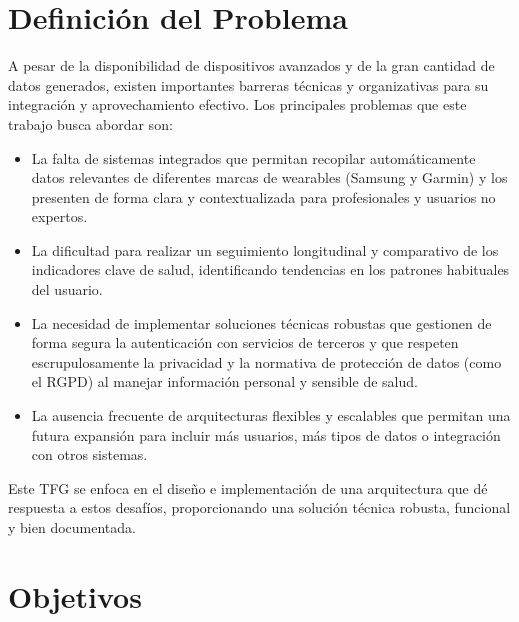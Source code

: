 \section{Definición del Problema}

A pesar de la disponibilidad de dispositivos avanzados y de la gran cantidad de datos generados, existen importantes barreras técnicas y organizativas para su integración y aprovechamiento efectivo. Los principales problemas que este trabajo busca abordar son:

\begin{itemize}
    \item La falta de sistemas integrados que permitan recopilar automáticamente datos relevantes de diferentes marcas de wearables (Samsung y Garmin) y los presenten de forma clara y contextualizada para profesionales y usuarios no expertos.
    \item La dificultad para realizar un seguimiento longitudinal y comparativo de los indicadores clave de salud, identificando tendencias en los patrones habituales del usuario.
    \item La necesidad de implementar soluciones técnicas robustas que gestionen de forma segura la autenticación con servicios de terceros y que respeten escrupulosamente la privacidad y la normativa de protección de datos (como el RGPD) al manejar información personal y sensible de salud.
    \item La ausencia frecuente de arquitecturas flexibles y escalables que permitan una futura expansión para incluir más usuarios, más tipos de datos o integración con otros sistemas.
\end{itemize}

Este TFG se enfoca en el diseño e implementación de una arquitectura que dé respuesta a estos desafíos, proporcionando una solución técnica robusta, funcional y bien documentada.

\section{Objetivos}

